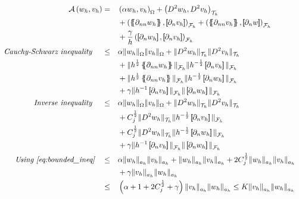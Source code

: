 \begin{equation*}
    \begin{split}
\mathcal{A} \left( w_{h}, v_{h} \right)   =& \quad \left( \alpha w_{h}, v_{h} \right) _{\Omega } +
    \left( D ^2 w_{h}, D ^2v_{h} \right) _{\mathcal{T} _{h}}
   \\
    &\quad  +
  \left( \mean{  \partial _{n n} w_{h} }, \jump{ \partial _{n }v_{h}} \right)_{\mathcal{F}_{h}}  +
 \left( \mean{ \partial _{n n} v_{h} }, \jump{ \partial _{n}w }      \right)_{\mathcal{F}_{h}} \\
 & \quad + \frac{\gamma }{h}  \left( \jump{ \partial _{n} w_{h}}, \jump{ \partial _{n} v_{h}   }   \right)_{\mathcal{F}_{h}} \\
\quad \textit{Cauchy-Schwarz inequality }\quad  \le& \quad  \alpha  \|  w_{h} \|_{\Omega   }^{  } \| v_{h} \|_{ \Omega  }^{  }     +
\| D ^2w_{h} \|_{\mathcal{T} _{h}   }^{  }  \| D ^2v_{h} \|_{\mathcal{T} _{h}   }^{  } \\
& \quad  + \| h^{\frac{1}{2}}\mean{ \partial _{nn} w_{h} } \|_{ \mathcal{F}_{h}  }^{  } \| h^{-\frac{1}{2}}\jump{ \partial _{n} v_{h} } \|_{ \mathcal{F}_{h}  }^{  }    \\
& \quad  + \| h^{\frac{1}{2}}\mean{ \partial _{nn} v_{h} }
\|_{ \mathcal{F}_{h}  }^{  } \| h^{-\frac{1}{2}}\jump{ \partial _{n} w_{h} } \|_{ \mathcal{F}_{h}  }^{  }  \\
& \quad + \gamma \| h^{-1} \jump{ \partial _{n} v_{h}}   \|_{ \mathcal{F} _{h} }^{  }   \|  \jump{ \partial _{n} w_{h}}   \|_{ \mathcal{F} _{h} }^{  } \\
\quad \textit{Inverse inequality }\quad  \le & \quad   \alpha  \|  w_{h} \|_{\Omega   }^{  } \| v_{h} \|_{ \Omega  }^{  }  +
\| D ^2w_{h} \|_{\mathcal{T} _{h}   }^{  }  \| D ^2v_{h} \|_{\mathcal{T} _{h}   }^{  } \\
& \quad + C_{j}^{\frac{1}{2}} \| D ^2 w_{h} \|_{\mathcal{T} _{h}  }^{  }  \| h^{-\frac{1}{2}}\jump{ \partial _{n} v_{h} } \|_{ \mathcal{F}_{h}  }^{  }
 \\
& \quad +  C_{j}^{\frac{1}{2}} \| D ^2 w_{h} \|_{\mathcal{T} _{h}  }^{  }
 \| h^{-\frac{1}{2}}\jump{ \partial _{n} w_{h} } \|_{ \mathcal{F}_{h}  }^{  }\\
 & \quad  + \gamma \| h^{-1} \jump{ \partial _{n} v_{h}}   \|_{ \mathcal{F} _{h} }^{  }   \|  \jump{ \partial _{n} w_{h}}   \|_{ \mathcal{F} _{h} }^{  } \\
\textit{ Using \eqref{eq:bounded_ineq}}  \quad  \le & \quad \alpha  \|  w_{h} \|_{a_{h}   }^{  } \| v_{h} \|_{ a_{h}   }^{  } + \| w_{h} \|_{ a_{h} }^{  } \| v_{h} \|_{ a_{h} }^{  }  + 2C_{j}^{\frac{1}{2}} \| w_{h} \|_{ a_{h} }^{  } \| v_{h} \|_{
a_{h} }^{  }  \\
 & \quad + \gamma \| v_{h} \|_{ a_{h} }^{  } \| w_{h} \|_{ a_{h} }^{  } \\
 \le& \quad   \left( \alpha + 1 + 2C_{j}^{\frac{1}{2}} + \gamma  \right)  \| v_{h} \|_{a_{h}  }^{  }  \| w_{h} \|_{ a_{h} }^{  }  \le  K  \| v_{h} \|_{a_{h}  }^{  }  \| w_{h} \|_{ a_{h} }^{  }
\end{split}
\end{equation*}


